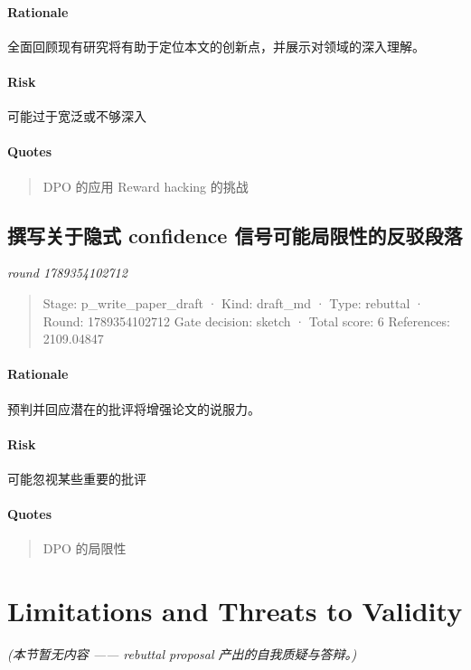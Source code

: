 \documentclass{article}
\begin{document}
\paragraph{Rationale}

全面回顾现有研究将有助于定位本文的创新点，并展示对领域的深入理解。

\paragraph{Risk}

可能过于宽泛或不够深入

\paragraph{Quotes}
\begin{quote}
DPO 的应用
Reward hacking 的挑战
\end{quote}

\subsection{撰写关于隐式 confidence 信号可能局限性的反驳段落}
\textit{round 1789354102712}\\
\begin{quote}
Stage: p\_write\_paper\_draft  ·  Kind: draft\_md  ·  Type: rebuttal  ·  Round: 1789354102712
Gate decision: sketch  ·  Total score: 6
References: 2109.04847
\end{quote}

\paragraph{Rationale}

预判并回应潜在的批评将增强论文的说服力。

\paragraph{Risk}

可能忽视某些重要的批评

\paragraph{Quotes}
\begin{quote}
DPO 的局限性
\end{quote}

\section{Limitations and Threats to Validity}
\textit{(本节暂无内容 —— rebuttal proposal 产出的自我质疑与答辩。)}
\end{document}
